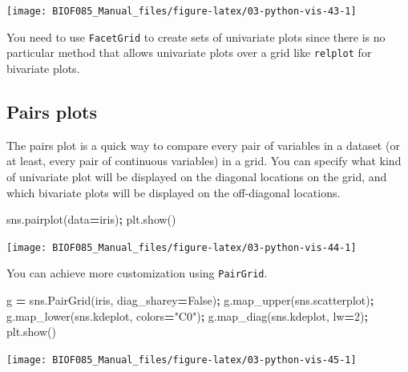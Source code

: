 \documentclass[
  letterpaper,
]{scrbook}
\newenvironment{Shaded}{\begin{snugshade}}{\end{snugshade}}
\newcommand{\DecValTok}[1]{\textcolor[rgb]{0.00,0.00,0.81}{#1}}
\newcommand{\NormalTok}[1]{#1}
\newcommand{\OperatorTok}[1]{\textcolor[rgb]{0.81,0.36,0.00}{\textbf{#1}}}
\newcommand{\StringTok}[1]{\textcolor[rgb]{0.31,0.60,0.02}{#1}}
\newcommand{\VariableTok}[1]{\textcolor[rgb]{0.00,0.00,0.00}{#1}}
\begin{document}
\begin{center}\texttt{[image: BIOF085\_Manual\_files/figure-latex/03-python-vis-43-1]} \end{center}

You need to use \texttt{FacetGrid} to create sets of univariate plots since there is no particular method that allows univariate plots over a grid like \texttt{relplot} for bivariate plots.

\hypertarget{pairs-plots}{%
\subsection{Pairs plots}\label{pairs-plots}}

The pairs plot is a quick way to compare every pair of variables in a dataset (or at least, every pair of continuous variables) in a grid. You can specify what kind of univariate plot will be displayed on the diagonal locations on the grid, and which bivariate plots will be displayed on the off-diagonal locations.

\begin{Shaded}
\begin{Highlighting}[]
\NormalTok{sns.pairplot(data}\OperatorTok{=}\NormalTok{iris)}\OperatorTok{;}
\NormalTok{plt.show()}
\end{Highlighting}
\end{Shaded}

\begin{center}\texttt{[image: BIOF085\_Manual\_files/figure-latex/03-python-vis-44-1]} \end{center}

You can achieve more customization using \texttt{PairGrid}.

\begin{Shaded}
\begin{Highlighting}[]
\NormalTok{g }\OperatorTok{=}\NormalTok{ sns.PairGrid(iris, diag\_sharey}\OperatorTok{=}\VariableTok{False}\NormalTok{)}\OperatorTok{;}
\NormalTok{g.map\_upper(sns.scatterplot)}\OperatorTok{;}
\NormalTok{g.map\_lower(sns.kdeplot, colors}\OperatorTok{=}\StringTok{"C0"}\NormalTok{)}\OperatorTok{;}
\NormalTok{g.map\_diag(sns.kdeplot, lw}\OperatorTok{=}\DecValTok{2}\NormalTok{)}\OperatorTok{;}
\NormalTok{plt.show()}
\end{Highlighting}
\end{Shaded}

\begin{center}\texttt{[image: BIOF085\_Manual\_files/figure-latex/03-python-vis-45-1]} \end{center}
\end{document}
